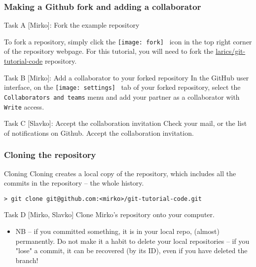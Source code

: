 
\begin{frame}[fragile]

\frametitle{Making a Github fork and adding a collaborator}

\begin{block}{Task A [Mirko]: Fork the example repository}

	To fork a repository, simply click the \texttt{[image: fork]} \, icon in the top right corner of the repository webpage. For this tutorial, you will need to fork the \href{https://github.com/larics/git-tutorial-code.git}{larics/git-tutorial-code} repository.
\end{block}

\begin{block}{Task B [Mirko]: Add a collaborator to your forked repository}
In the GitHub user interface, on the \texttt{[image: settings]} \, tab of your forked repository, select the \texttt{Collaborators and teams} menu and add your partner as a collaborator with \texttt{Write} access.
\end{block}

\begin{block}{Task C [Slavko]: Accept the collaboration invitation}
Check your mail, or the list of notifications on Github. Accept the collaboration invitation.
\end{block}

\end{frame}


\begin{frame}[fragile]

\frametitle{Cloning the repository}

\begin{block}{Cloning}
Cloning creates a local copy of the repository, which includes all the commits in the repository -- the whole history.
\begin{verbatim}
> git clone git@github.com:<mirko>/git-tutorial-code.git
\end{verbatim}
\end{block}

\begin{block}{Task D [Mirko, Slavko]}
Clone Mirko's repository onto your computer.
\end{block}

\begin{itemize}
    \item NB -- if you committed something, it is in your local repo, (almost) permanently. Do not make it a habit to delete your local repositories -- if you "lose" a commit, it can be recovered (by its ID), even if you have deleted the branch!
\end{itemize}
	
\end{frame}

